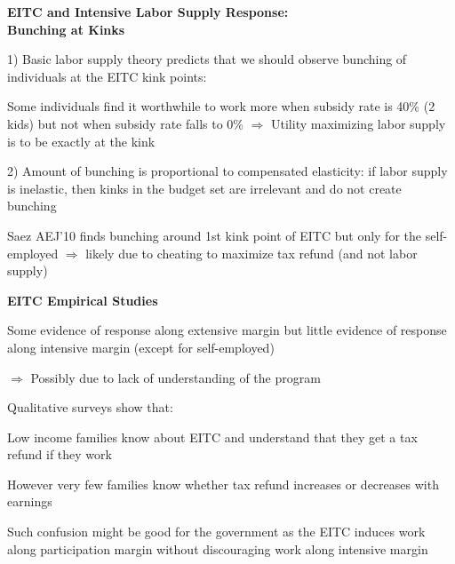 \documentclass[landscape]{slides}
\begin{document}
\begin{slide}

\end{slide}


\begin{slide}%
\begin{center}
{\bf EITC and Intensive Labor Supply Response: \\ Bunching at Kinks}
\end{center}
1) Basic labor supply theory predicts that we should observe
bunching of individuals at the EITC kink points:

Some individuals find it worthwhile to work more when subsidy rate is 40\% (2 kids)
but not when subsidy rate falls to 0\% $\Rightarrow$ Utility maximizing labor supply is to
be exactly at the kink 

2) Amount of bunching is proportional to compensated elasticity:
if labor supply is inelastic, then kinks in the budget set are irrelevant and 
do not create bunching

Saez AEJ'10 finds bunching around 1st kink point of EITC but only
for the self-employed $\Rightarrow$ likely due to cheating
to maximize tax refund (and not labor supply)
\end{slide}

\begin{slide}

\end{slide}

%

%

\begin{slide}

\end{slide}


\begin{slide}%
\begin{center}
{\bf EITC Empirical Studies}
\end{center}
Some evidence of response along extensive margin but little
evidence of response along intensive margin (except for
self-employed)

$\Rightarrow$ Possibly due to lack of understanding
of the program

Qualitative surveys show that:

Low income families know about EITC and understand that they get a
tax refund if they work

However very few families know whether tax refund increases or
decreases with earnings

Such confusion might be good for the government as the EITC
induces work along participation margin without discouraging work
along intensive margin
\end{slide}
\end{document}
